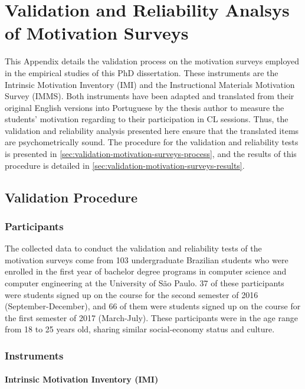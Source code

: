 \chapter{Validation and Reliability Analsys of Motivation Surveys}
\label{appendix:validation-motivation-surveys}

This Appendix details the validation process on the motivation surveys employed in the empirical studies of this PhD dissertation. These instruments are the Intrinsic Motivation Inventory (IMI) and the Instructional Materials Motivation Survey (IMMS). Both instruments have been adapted and translated from their original English versions into Portuguese by the thesis author to measure the students' motivation regarding to their participation in CL sessions. Thus, the validation and reliability analysis presented here ensure that the translated items are psychometrically sound. The procedure for the validation and reliability tests is presented in \autoref{sec:validation-motivation-surveys-process}, and the results of this procedure is detailed in \autoref{sec:validation-motivation-surveys-results}.

\section{Validation Procedure}
\label{sec:validation-motivation-surveys-process}

\subsection{Participants}

The collected data to conduct the validation and reliability tests of the motivation surveys come from 103 undergraduate Brazilian students who were enrolled in the first year of bachelor degree programs in computer science and computer engineering at the University of São Paulo. 37 of these participants were students signed up on the course  for the second semester of 2016 (September-December), and 66 of them were students signed up on the course for the first semester of 2017 (March-July). These participants were in the age range from 18 to 25 years old, sharing similar social-economy status and culture.

\subsection{Instruments}

\subsubsection*{Intrinsic Motivation Inventory (IMI)}

